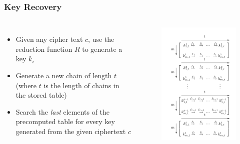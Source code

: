 \documentclass{beamer}
\begin{document}
\begin{frame}
\frametitle{Key Recovery}
\begin{columns}[c]
\begin{itemize}
\item Given any cipher text $c$, use the reduction function $R$ to generate a key $k_i$
\item Generate a new chain of length $t$ (where $t$ is the length of chains in the stored table)
\item Search the \emph{last} elements of the precomputed table for every key generated from the given ciphertext $c$
\end{itemize}
\begin{figure}
\includegraphics[width=0.9\linewidth]{figs/classic}
\end{figure}
\end{columns}
\end{frame}
\end{document}
